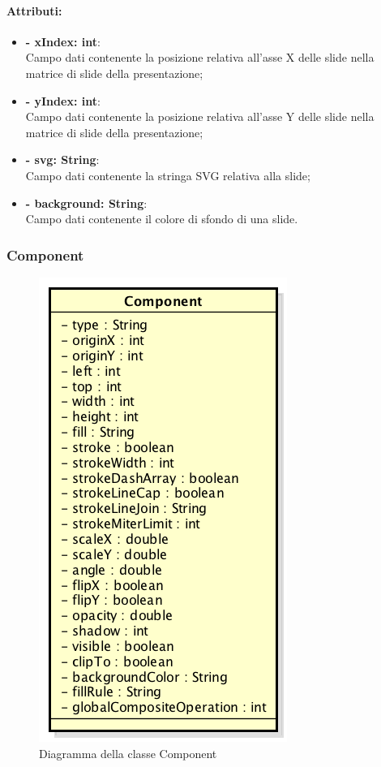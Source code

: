 	\paragraph{Attributi:}
	\begin{itemize}
		\item \textbf{- xIndex: int}:\\
			Campo dati contenente la posizione relativa all'asse X delle \gls{slide} nella matrice di \gls{slide} della presentazione;
		\item \textbf{- yIndex: int}:\\
			Campo dati contenente la posizione relativa all'asse Y delle \gls{slide} nella matrice di \gls{slide} della presentazione;
		\item \textbf{- svg: String}:\\
			Campo dati contenente la stringa SVG relativa alla \gls{slide};
		\item \textbf{- background: String}:\\
			Campo dati contenente il colore di sfondo di una \gls{slide}.
	\end{itemize}
	
	
\newpage


\subsubsection{Component}

	\begin{figure}[h]
		\centering
		\includegraphics[width=0.4\linewidth]{img/premi_front_end_model_component}
		\caption[Diagramma della classe Component]{Diagramma della classe Component}
		\label{fig:back_end_premi_model_component}
	\end{figure}
	
